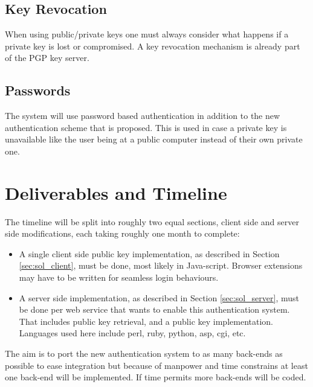 \documentclass[11pt]{article}
\begin{document}
\subsection{Key Revocation} \label{sec:sol_key_revo}
When using public/private keys one must always consider what happens if a private key is lost or compromised. A key revocation mechanism is already part of the PGP key server. 

\subsection{Passwords} \label{sec:sol_pw}
The system will use password based authentication in addition to the new authentication scheme that is proposed. This is used in case a private key is unavailable like the user being at a public computer instead of their own private one.


\section{Deliverables and Timeline} \label{sec:deliv}
The timeline will be split into roughly two equal sections, client side and server side modifications, each taking roughly one month to complete:
\begin{itemize}
	\item A single client side public key implementation, as described in Section \ref{sec:sol_client}, must be done, most likely in Java-script. Browser extensions may have to be written for seamless login behaviours.
	\item A server side implementation, as described in Section \ref{sec:sol_server}, must be done per web service that wants to enable this authentication system. That includes public key retrieval, and a public key implementation. Languages used here include perl, ruby, python, asp, cgi, etc.
\end{itemize}

The aim is to port the new authentication system to as many back-ends as possible to ease integration but because of manpower and time constrains at least one back-end will be implemented. If time permits more back-ends will be coded.
\end{document}
